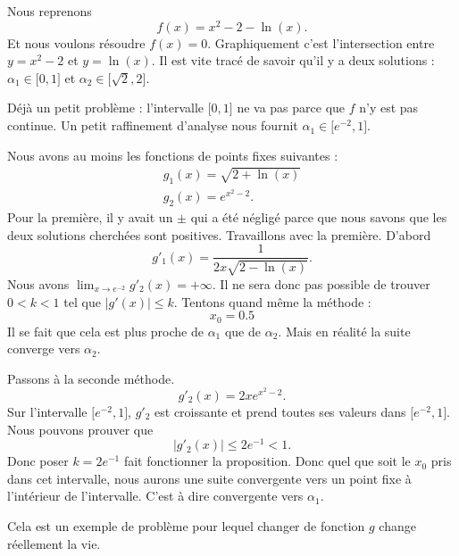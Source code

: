 \begin{example}
    Nous reprenons 
    \begin{equation}
        f(x)=x^2-2-\ln(x).
    \end{equation}
    Et nous voulons résoudre \( f(x)=0\). Graphiquement c'est l'intersection entre \( y=x^2-2\) et \( y=\ln(x)\). Il est vite tracé de savoir qu'il y a deux solutions  : \( \alpha_1\in\mathopen[ 0 , 1 \mathclose]\) et \( \alpha_2\in\mathopen[ \sqrt{2} , 2 \mathclose]\).

    Déjà un petit problème : l'intervalle \( \mathopen[ 0 , 1 \mathclose]\) ne va pas parce que \( f\) n'y est pas continue. Un petit raffinement d'analyse nous fournit \( \alpha_1\in\mathopen[ e^{-2} , 1 \mathclose]\).

    Nous avons au moins les fonctions de points fixes suivantes :
    \begin{subequations}
        \begin{align}
            g_1(x)=\sqrt{ 2+\ln(x) }\\
            g_2(x)=e^{x^2-2}.
        \end{align}
    \end{subequations}
    Pour la première, il y avait un \( \pm\) qui a été négligé parce que nous savons que les deux solutions cherchées sont positives.
    Travaillons avec la première. D'abord
    \begin{equation}
        g'_1(x)=\frac{ 1 }{ 2x\sqrt{ 2-\ln(x) } }.
    \end{equation}
    Nous avons \( \lim_{x\to e^{-2}} g'_2(x)=+\infty\). Il ne sera donc pas possible de trouver \( 0<k<1\) tel que \( | g'(x) |\leq k\). Tentons quand même la méthode :
    \begin{equation}
        x_0=0.5
    \end{equation}
    Il se fait que cela est plus proche de \( \alpha_1\) que de \( \alpha_2\). Mais en réalité la suite converge vers \( \alpha_2\).

    Passons à la seconde méthode. 
    \begin{equation}
        g'_2(x)=2xe^{x^2-2}.
    \end{equation}
    Sur l'intervalle \( \mathopen[ e^{-2} , 1 \mathclose]\), \( g'_2\) est croissante et prend toutes ses valeurs dans \( \mathopen[ e^{-2} , 1 \mathclose]\). Nous pouvons prouver que 
    \begin{equation}
        | g'_2(x) |\leq 2e^{-1}<1.
    \end{equation}
    Donc poser \( k=2e^{-1}\) fait fonctionner la proposition. Donc quel que soit le \( x_0\) pris dans cet intervalle, nous aurons une suite convergente vers un point fixe à l'intérieur de l'intervalle. C'est à dire convergente vers \( \alpha_1\).

    Cela est un exemple de problème pour lequel changer de fonction \( g\) change réellement la vie.
\end{example}

